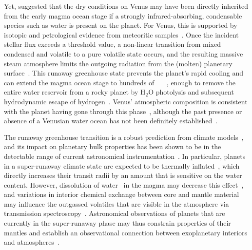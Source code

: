\documentclass[twocolumn,twocolappendix]{aastex631}
\begin{document}
Yet, \citet{Hamano2013} suggested that the dry conditions on Venus may have been directly inherited from the early magma ocean stage if a strongly infrared-absorbing, condensable species such as water is present on the planet.
For Venus, this is supported by isotopic and petrological evidence from meteoritic samples~\citep{2018SSRv..214...36A,2022Natur.611..245B}.
Once the incident stellar flux exceeds a threshold value, a non-linear transition from mixed condensed and volatile to a pure volatile state occurs, and the resulting massive steam atmosphere limits the outgoing radiation from the (molten) planetary surface~\citep{Ingersoll1969,Kasting1988,2010ppc..book.....P,Goldblatt2013,2015ExA....40..449L,2017JGRE..122.1458S}.
This runaway greenhouse state prevents the planet's rapid cooling and can extend the magma ocean stage to hundreds of \SI{}{\mega\year}~\citep{2016ApJ...829...63S,2021AsBio..21.1325B}, enough to remove the entire water reservoir from a rocky planet by H$_2$O photolysis and subsequent hydrodynamic escape of hydrogen~\citep{2013ApJ...778..154W,2014ApJ...785L..20W,Luger2015}.
Venus' atmospheric composition is consistent with the planet having gone through this phase~\citep{2020NatGe..13..265G}, although the past presence or absence of a Venusian water ocean has not been definitely established~\citep{Raymond2006,Raymond2007,Hamano2013,Way2016,2019JGRE..124.2015K,2021JGRE..12606643K,Turbet2021,2023PNAS..12009751W}.

The runaway greenhouse transition is a robust prediction from climate models~\citep{Forget2014,Boukrouche2021,2022A&A...658A..40C}, and its impact on planetary bulk properties has been shown to be in the detectable range of current astronomical instrumentation~\citep{Goldblatt2015}.
In particular, planets in a super-runaway climate state are expected to be thermally inflated~\citep{Turbet2019,Turbet2020,Mousis2020}, which directly increases their transit radii by an amount that is sensitive on the water content.
However, dissolution of water~\citep[e.g.,][]{Elkins-Tanton2008,Hier-Majumder2017,Salvador2023} in the magma may decrease this effect~\citep{Dorn2021}, and variations in interior chemical exchange between core and mantle material may influence the outgassed volatiles that are visible in the atmosphere via transmission spectroscopy~\citep{2021ApJ...914L...4L,Schlichting2022}.
Astronomical observations of planets that are currently in the super-runaway phase may thus constrain properties of their mantles and establish an observational connection between exoplanetary interiors and atmospheres~\citep{Lichtenberg2022,Wordsworth2022}.
\end{document}

